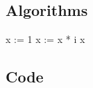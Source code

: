 \documentclass{article}
\begin{document}
\subsection*{Algorithms}
\begin{algorithmic}
        \State x := 1
            \State x := x * i
        \EndFor
        \State \Return x
    \EndFunction
\end{algorithmic}

\subsection*{Code}

\end{document}
